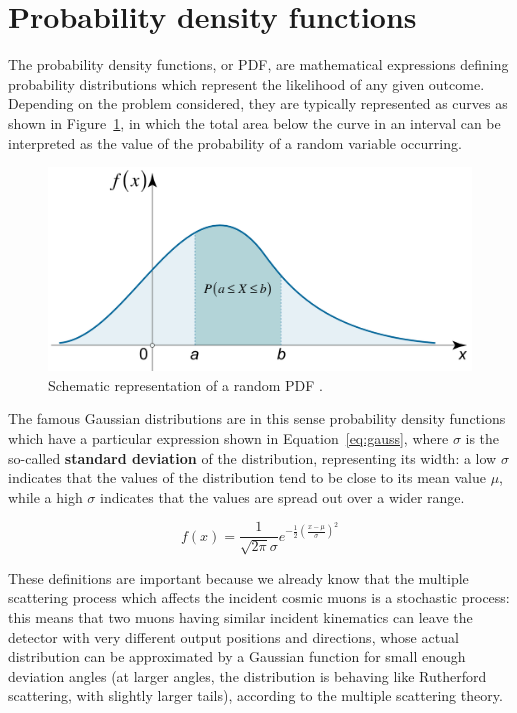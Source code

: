 \documentclass[a4paper, 11pt]{report}
\begin{document}
\section{Probability density functions} \label{sec:PDF}

The probability density functions, or PDF, are mathematical expressions defining probability distributions which represent the likelihood of any given outcome. Depending on the problem considered, they are typically represented as curves as shown in Figure~\ref{fig:PDF}, in which the total area below the curve in an interval can be interpreted as the value of the probability of a random variable occurring. 

\begin{figure}[htbp]
\begin{center}
\includegraphics[width=12cm, height=5.4cm]{figs/PDF.png}
\caption{Schematic representation of a random PDF \cite{PDF}.}
\label{fig:PDF}
\end{center}
\end{figure}

The famous Gaussian distributions are in this sense probability density functions which have a particular expression shown in Equation~\ref{eq:gauss}, where $\sigma$ is the so-called \textbf{standard deviation} of the distribution, representing its width: a low $\sigma$ indicates that the values of the distribution tend to be close to its mean value $\mu$, while a high $\sigma$ indicates that the values are spread out over a wider range.

\begin{equation}
\label{eq:gauss}
f(x) = \frac{1}{\sqrt{2 \pi} \sigma} e^{-\frac{1}{2} \left (\frac{x - \mu}{\sigma} \right )^2}
\end{equation}

These definitions are important because we already know that the multiple scattering process which affects the incident cosmic muons is a stochastic process: this means that two muons having similar incident kinematics can leave the detector with very different output positions and directions, whose actual distribution can be approximated by a Gaussian function for small enough deviation angles (at larger angles, the distribution is behaving like Rutherford scattering, with slightly larger tails), according to the multiple scattering theory. 
\end{document}
